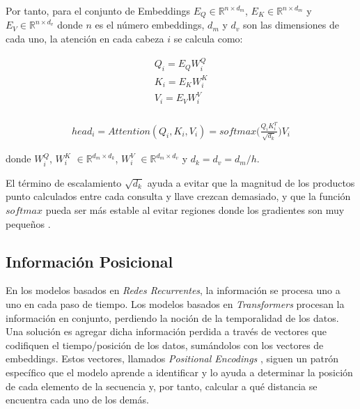 Por tanto, para el conjunto de Embeddings  $E_Q \in \mathbb{R}^{n \times d_m}$,
$E_K \in \mathbb{R}^{n \times d_m}$ y $E_V \in \mathbb{R}^{n \times d_v}$ donde $n$ es el número
embeddings, $d_m$ y $d_v$ son las dimensiones de cada uno, la atención en cada cabeza $i$ se calcula
como:

\begin{equation}
    \begin{split}
        Q_i = E_Q W_i^Q\\
        K_i = E_K W_i^K\\
        V_i = E_V W_i^V\\
    \end{split}
\end{equation}

\begin{equation}
\begin{split}
    head_i = Attention(Q_i, K_i, V_i) = softmax\Big(\frac{Q_i K_i^T}{\sqrt{d_k}}\Big) V_i
    \label{eq:trans_att}
\end{split}
\end{equation}

\noindent donde $W_i^Q$, $W_i^K$ $\in \mathbb{R}^{d_m \times d_k}$, $W_i^V$ $\in \mathbb{R}^{d_m \times d_v}$
y $d_k=d_v=d_m/h$.

El término de escalamiento $\sqrt{d_k}$ ayuda a evitar que la magnitud de los productos punto calculados
entre cada consulta y llave crezcan demasiado, y que la función $softmax$ pueda ser más estable al evitar
regiones donde los gradientes son muy pequeños \cite{Vaswani}.



\subsection{Información Posicional}

En los modelos basados en \textit{Redes Recurrentes}, la información se procesa uno a uno en cada paso
de tiempo. Los modelos basados en \textit{Transformers} procesan la información en conjunto, perdiendo
la noción de la temporalidad de los datos. Una solución es agregar dicha información perdida a través
de vectores que codifiquen el tiempo/posición de los datos, sumándolos con los vectores de embeddings.
Estos vectores, llamados \textit{Positional Encodings} \cite{DBLP:journals/corr/GehringAGYD17}, siguen
un patrón específico que el modelo aprende a identificar y lo ayuda a determinar la posición de cada
elemento de la secuencia y, por tanto, calcular a qué distancia se encuentra cada uno de los demás.

